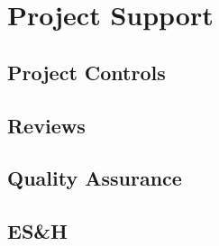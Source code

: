 \section{Project Support}
\label{sec:fdsp-coord-supp}


\subsection{Project Controls}
\label{sec:fdsp-coord-controls}


\subsection{Reviews}
\label{sec:fdsp-coord-reviews}


\subsection{Quality Assurance}
\label{sec:fdsp-coord-qa}


\subsection{ES\&H}
\label{sec:fdsp-coord-esh}


